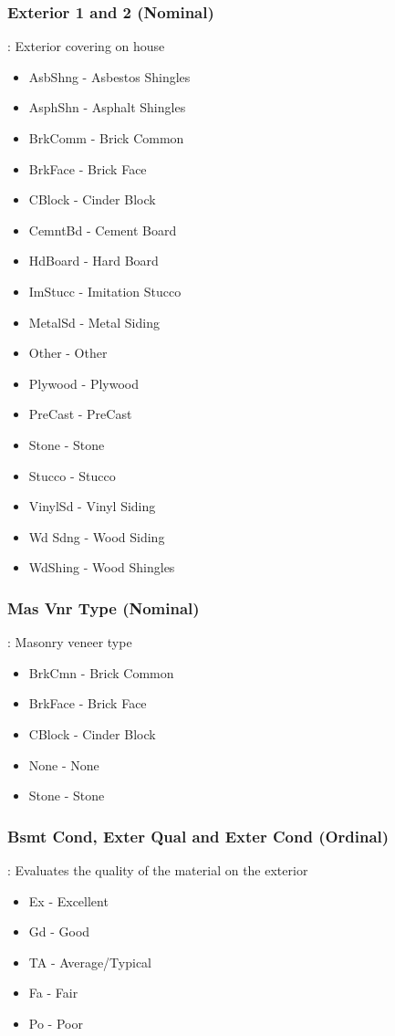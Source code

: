 \documentclass[sigconf]{acmart}
\begin{document}
	\subsubsection{Exterior 1 and 2 (Nominal)}: Exterior covering on house
	\begin{itemize}
		\item  AsbShng - Asbestos Shingles
		\item  AsphShn - Asphalt Shingles
		\item  BrkComm - Brick Common
		\item  BrkFace - Brick Face
		\item  CBlock -  Cinder Block
		\item  CemntBd - Cement Board
		\item  HdBoard - Hard Board
		\item  ImStucc - Imitation Stucco
		\item  MetalSd - Metal Siding
		\item  Other - Other
		\item  Plywood - Plywood
		\item  PreCast - PreCast
		\item  Stone - Stone
		\item  Stucco - Stucco
		\item  VinylSd - Vinyl Siding
		\item  Wd Sdng - Wood Siding
		\item  WdShing - Wood Shingles
	\end{itemize}

	\subsubsection{Mas Vnr Type (Nominal)}: Masonry veneer type
	\begin{itemize}
		\item  BrkCmn - Brick Common
		\item  BrkFace - Brick Face
		\item  CBlock - Cinder Block
		\item  None - None
		\item  Stone - Stone
	\end{itemize}

	\subsubsection{Bsmt Cond, Exter Qual and Exter Cond (Ordinal)}: Evaluates the quality of the material on the exterior
	\begin{itemize}
		\item  Ex - Excellent
		\item  Gd - Good
		\item  TA - Average/Typical
		\item  Fa - Fair
		\item  Po - Poor
	\end{itemize}
\end{document}

